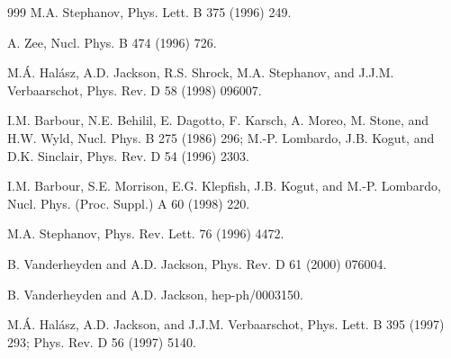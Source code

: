 \begin{thebibliography}{999}
      M.A. Stephanov,
                      Phys. Lett. B 375 (1996) 249.              %

     A. Zee, 
                      Nucl. Phys. B 474 (1996) 726.              %

       M.\'A. Hal\'asz, A.D. Jackson, R.S. Shrock,
                      M.A. Stephanov, and J.J.M. Verbaarschot,  
                      Phys. Rev. D 58 (1998) 096007.             %

   I.M. Barbour, N.E. Behilil, E. Dagotto, F. Karsch,
                      A. Moreo, M. Stone, and H.W. Wyld, 
                      Nucl. Phys. B 275 (1986) 296;              %
                      M.-P. Lombardo, J.B. Kogut, and D.K. Sinclair, 
                      Phys. Rev. D 54 (1996) 2303.               %

       I.M. Barbour, S.E. Morrison, E.G. Klepfish,
                      J.B. Kogut, and M.-P. Lombardo, 
                      Nucl. Phys. (Proc. Suppl.) A 60 (1998) 220.   %

       M.A. Stephanov,
                      Phys. Rev. Lett. 76 (1996) 4472.              %

 B. Vanderheyden and A.D. Jackson,
                      Phys. Rev. D 61 (2000) 076004.

 B. Vanderheyden and A.D. Jackson,
                      hep-ph/0003150.

    M.\'A. Hal\'asz, A.D. Jackson, and J.J.M. Verbaarschot,
                      Phys. Lett. B 395 (1997) 293;              %
                      Phys. Rev. D 56 (1997) 5140.               %


\end{thebibliography}
